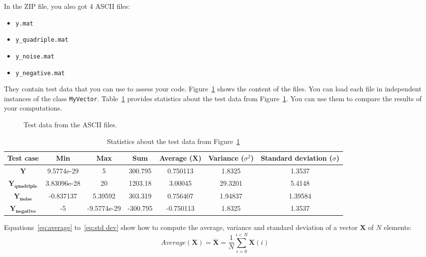 \documentclass[english,a4paper,12pt,oneside]{article}
\begin{document}
In the ZIP file, you also got 4 ASCII files:
\begin{itemize}
 \item \verb+y.mat+
 \item \verb+y_quadriple.mat+
 \item \verb+y_noise.mat+
 \item \verb+y_negative.mat+
\end{itemize}
They contain test data that you can use to assess your code. 
Figure~\ref{fig:test data} shows the content of the files. 
You can load each file in independent instances of the class \verb+MyVector+. 
Table~\ref{tab:test data} provides statistics about the test data from Figure~\ref{fig:test data}. 
You can use them to compare the results of your computations. 
\begin{figure}[htb]
\centering
\scalebox{0.75}{}
 \caption{\label{fig:test data}Test data from the ASCII files.}
\end{figure}
\begin{table}[htb]
\caption{\label{tab:test data}Statistics about the test data from Figure~\ref{fig:test data}}
\centering
\begin{footnotesize}
 \begin{tabular}{|c|c|c|c|c|c|c|}
  \hline
  \textbf{Test case} & \textbf{Min} & \textbf{Max} & \textbf{Sum} & \textbf{Average} ($\overline{\mathbf{X}}$)& \textbf{Variance} ($\sigma^2$) & \textbf{Standard deviation} ($\sigma$)\\
  \hline
  \hline
  $\mathbf{Y}$ & 9.5774e-29 & 5 & 300.795 & 0.750113 & 1.8325 & 1.3537 \\
  \hline
  $\mathbf{Y_{quadriple}}$ & 3.83096e-28 & 20 & 1203.18 & 3.00045 & 29.3201 & 5.4148 \\
  \hline
  $\mathbf{Y_{noise}}$ & -0.837137 & 5.39592 & 303.319 & 0.756407 & 1.94837 & 1.39584 \\
  \hline
  $\mathbf{Y_{negative}}$ & -5 & -9.5774e-29 & -300.795 & -0.750113 & 1.8325 & 1.3537 \\
  \hline
 \end{tabular}
\end{footnotesize}
\end{table}

Equations~\ref{eq:average} to~\ref{eq:std dev} show how to compute the average, variance and standard deviation of a vector $\mathbf{X}$ of $N$ elements:
\begin{equation}
 Average(\mathbf{X}) = \overline{\mathbf{X}} = \frac{1}{N}\sum_{i=0}^{i < N} \mathbf{X}(i)
 \label{eq:average}
\end{equation}
\end{document}
